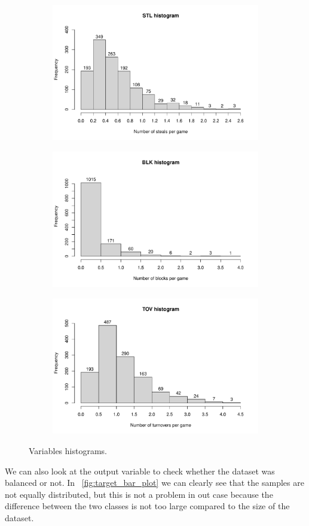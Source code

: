 \begin{figure}[h]
\begin{subfigure}{.33\textwidth}
		\label{fig:HistAST}
	\end{subfigure}%
	\begin{subfigure}{.33\textwidth}
		\centering
		\includegraphics[width=0.6\linewidth]{ImageFiles/Histograms/histogram_stl.pdf}
		\label{fig:HistSTL}
	\end{subfigure}%
	\begin{subfigure}{.33\textwidth}
		\centering
		\includegraphics[width=0.6\linewidth]{ImageFiles/Histograms/histogram_blk.pdf}
		\label{fig:HistBLK}
	\end{subfigure}
	\begin{subfigure}{.33\textwidth}
		\centering
		\includegraphics[width=0.6\linewidth]{ImageFiles/Histograms/histogram_tov.pdf}
		\label{fig:HistTOV}
	\end{subfigure}
	\caption{Variables histograms.}
	\label{fig:Histograms}
\end{figure}

We can also look at the output variable to check whether the dataset was balanced or not. In \Fig~\ref{fig:target_bar_plot} we can clearly see that the samples are not equally distributed, but this is not a problem in out case because the difference between the two classes is not too large compared to the size of the dataset.

